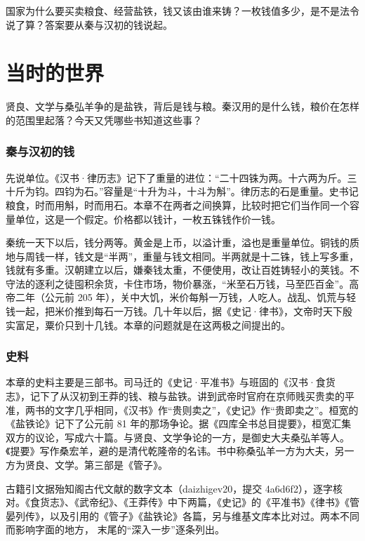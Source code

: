 国家为什么要买卖粮食、经营盐铁，钱又该由谁来铸？一枚钱值多少，是不是法令说了算？答案要从秦与汉初的钱说起。

\section{当时的世界}\label{sec:qinhan-world}

贤良、文学与桑弘羊争的是盐铁，背后是钱与粮。秦汉用的是什么钱，粮价在怎样的范围里起落？今天又凭哪些书知道这些事？

\subsubsection{秦与汉初的钱}
先说单位。《汉书·律历志》记下了重量的进位：“二十四铢为两。十六两为斤。三十斤为钧。四钧为石。”容量是“十升为斗，十斗为斛”\cite{hanshu}。律历志的石是重量。史书记粮食，时而用斛，时而用石。本章不在两者之间换算，比较时把它们当作同一个容量单位，这是一个假定。价格都以钱计，一枚五铢钱作价一钱。

秦统一天下以后，钱分两等。黄金是上币，以溢计重，溢也是重量单位。铜钱的质地与周钱一样，钱文是“半两”，重量与钱文相同\cite{hanshu}。半两就是十二铢，钱上写多重，钱就有多重。汉朝建立以后，嫌秦钱太重，不便使用，改让百姓铸轻小的荚钱。不守法的逐利之徒囤积余货，卡住市场，物价暴涨，“米至石万钱，马至匹百金”\cite{hanshu}。高帝二年（公元前 205 年），关中大饥，米价每斛一万钱，人吃人\cite{hanshu}。战乱、饥荒与轻钱一起，把米价推到每石一万钱。几十年以后，据《史记·律书》，文帝时天下殷实富足，粟价只到十几钱\cite{shiji}。本章的问题就是在这两极之间提出的。

\subsubsection{史料}
本章的史料主要是三部书。司马迁的《史记·平准书》与班固的《汉书·食货志》，记下了从汉初到王莽的钱、粮与盐铁。讲到武帝时官府在京师贱买贵卖的平准，两书的文字几乎相同，《汉书》作“贵则卖之”，《史记》作“贵即卖之”\cite{hanshu,shiji}。桓宽的《盐铁论》记下了公元前 81 年的那场争论。据《四库全书总目提要》，桓宽汇集双方的议论，写成六十篇。与贤良、文学争论的一方，是御史大夫桑弘羊等人\cite{yantielun}。《提要》写作桑宏羊，避的是清代乾隆帝的名讳。书中称桑弘羊一方为大夫，另一方为贤良、文学。第三部是《管子》。

古籍引文据殆知阁古代文献的数字文本（daizhigev20，提交 4a6d6f2），逐字核对。《食货志》、《武帝纪》、《王莽传》中下两篇，《史记》的《平准书》《律书》《管晏列传》，以及引用的《管子》《盐铁论》各篇，另与维基文库本比对过。两本不同而影响字面的地方， 末尾的“深入一步”逐条列出。

